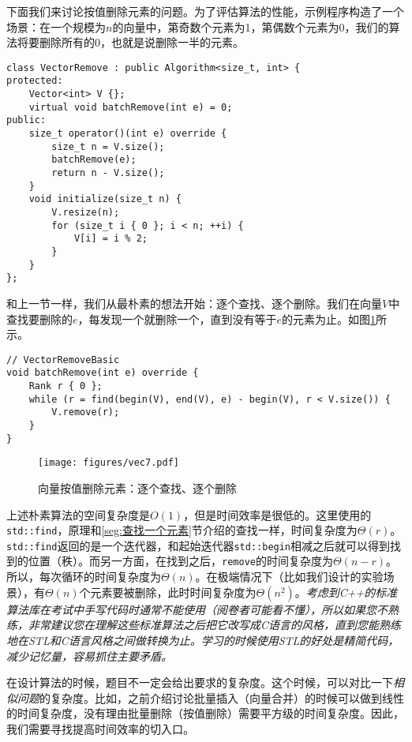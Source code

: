下面我们来讨论按值删除元素的问题。为了评估算法的性能，示例程序构造了一个场景：在一个规模为$n$的向量中，第奇数个元素为1，第偶数个元素为0，我们的算法将要删除所有的0，也就是说删除一半的元素。

\begin{lstlisting}
class VectorRemove : public Algorithm<size_t, int> {
protected:
    Vector<int> V {};
    virtual void batchRemove(int e) = 0;
public:
    size_t operator()(int e) override {
        size_t n = V.size();
        batchRemove(e);
        return n - V.size();
    }
    void initialize(size_t n) {
        V.resize(n);
        for (size_t i { 0 }; i < n; ++i) {
            V[i] = i % 2;
        }
    }
};
\end{lstlisting}

和上一节一样，我们从最朴素的想法开始：逐个查找、逐个删除。我们在向量$V$中查找要删除的$e$，每发现一个就删除一个，直到没有等于$e$的元素为止。如图\ref{fig:vec7}所示。

\begin{lstlisting}
// VectorRemoveBasic
void batchRemove(int e) override {
    Rank r { 0 };
    while (r = find(begin(V), end(V), e) - begin(V), r < V.size()) {
        V.remove(r);
    }
}
\end{lstlisting}

\begin{figure}
  \centering
  \texttt{[image: figures/vec7.pdf]}
  \caption{向量按值删除元素：逐个查找、逐个删除}
  \label{fig:vec7}
\end{figure}

上述朴素算法的空间复杂度是$O(1)$，但是时间效率是很低的。这里使用的\lstinline{std::find}，原理和\ref{seg:查找一个元素}节介绍的查找一样，时间复杂度为$\Theta(r)$。\lstinline{std::find}返回的是一个迭代器，和起始迭代器\lstinline{std::begin}相减之后就可以得到找到的位置（秩）。而另一方面，在找到之后，\lstinline{remove}的时间复杂度为$\Theta(n-r)$。所以，每次循环的时间复杂度为$\Theta(n)$。在极端情况下（比如我们设计的实验场景），有$\Theta(n)$个元素要被删除，此时时间复杂度为$\Theta(n^2)$。\textit{考虑到C++的标准算法库在考试中手写代码时通常不能使用（阅卷者可能看不懂），所以如果您不熟练，非常建议您在理解这些标准算法之后把它改写成C语言的风格，直到您能熟练地在STL和C语言风格之间做转换为止。学习的时候使用STL的好处是精简代码，减少记忆量，容易抓住主要矛盾。}

在设计算法的时候，题目不一定会给出要求的复杂度。这个时候，可以对比一下\textit{相似问题}的复杂度。比如，之前介绍讨论批量插入（向量合并）的时候可以做到线性的时间复杂度，没有理由批量删除（按值删除）需要平方级的时间复杂度。因此，我们需要寻找提高时间效率的切入口。

